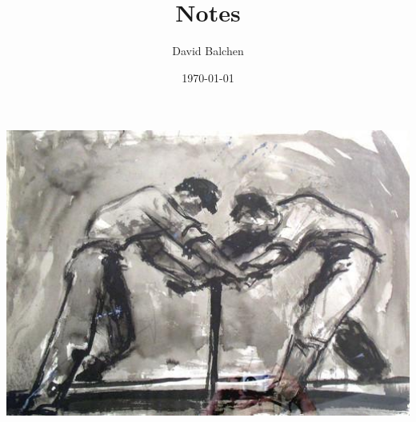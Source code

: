 \documentclass[12pt,twoside]{article}
\title{\myfont Notes}
\author{David Balchen}
\date{\today}
\begin{document}
\maketitle
\vspace*{1cm}
\includegraphics[width=15.0cm]{Pictures/Andrejevi1.jpg}
\setcounter{tocdepth}{3}
\vspace*{1cm}
\pagenumbering{}
\newpage
\end{document}
